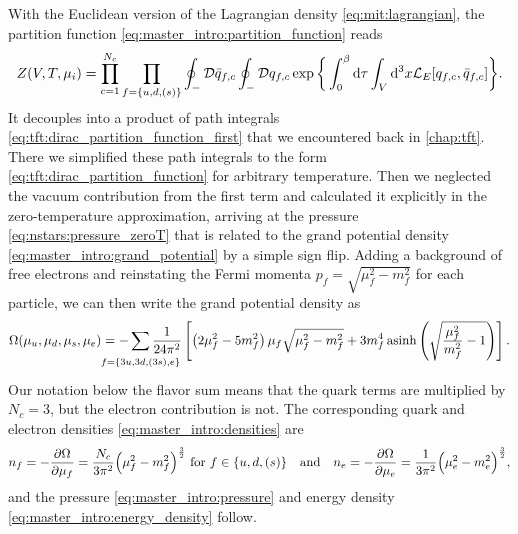 With the Euclidean version of the Lagrangian density \eqref{eq:mit:lagrangian},
the partition function \eqref{eq:master_intro:partition_function} reads
\begin{equation}
	Z(V, T, \mu_i) = \prod_{c=1}^{N_c} \prod_{f=\{u,d,(s)\}} \oint_- \mathcal{D} \bar{q}_{f,c} \oint_- \mathcal{D} q_{f,c} \exp \bigg\{ \int_0^\beta \mathop{}\!\mathrm{d} \tau \int_V \mathop{}\!\mathrm{d}^3 x \mathcal{L}_E [q_{f,c},\bar{q}_{f,c}] \bigg\} .
\end{equation}
It decouples into a product of path integrals \eqref{eq:tft:dirac_partition_function_first} that we encountered back in \cref{chap:tft}.
There we simplified these path integrals to the form \eqref{eq:tft:dirac_partition_function} for arbitrary temperature.
Then we neglected the vacuum contribution from the first term and calculated it explicitly in the zero-temperature approximation,
arriving at the pressure \eqref{eq:nstars:pressure_zeroT} that is related to the grand potential density \eqref{eq:master_intro:grand_potential} by a simple sign flip.
Adding a background of free electrons and reinstating the Fermi momenta $p_f = \sqrt{\mu_f^2-m_f^2}$ for each particle,
we can then write the grand potential density as
\begin{equation}
	\Omega(\mu_u,\mu_d,\mu_s,\mu_e) = -\smashoperator{\sum_{\vphantom{\big|} f=\{3u,3d,(3s),e\}}} \frac{1}{24 \pi^2} \left[ \left( 2 \mu_f^2 - 5 m_f^2 \right) \mu_f \sqrt{\mu_f^2 - m_f^2} + 3 m_f^4 \asinh \left( \sqrt{\frac{\mu_{\smash{f}}^2}{m_f^2}-1} \right) \right] .
\label{eq:mit:grand_potential}
\end{equation}
Our notation below the flavor sum means that the quark terms are multiplied by $N_c=3$,
but the electron contribution is not.
The corresponding quark and electron densities \eqref{eq:master_intro:densities} are
\begin{equation}
	n_f = -\pdv{\Omega}{\mu_f} = \frac{N_c}{3 \pi^2} \Big( \mu_f^2 - m_f^2 \Big)^{\frac32}
	\text{ for $f \in \{u,d,(s)\}$}
	\quad \text{and} \quad
	n_e = -\pdv{\Omega}{\mu_e} = \frac{  1}{3 \pi^2} \Big( \mu_e^2 - m_e^2 \Big)^{\frac32},
\label{eq:mit:particle_densities}%
\end{equation}
and the pressure \eqref{eq:master_intro:pressure} and energy density \eqref{eq:master_intro:energy_density} follow.

